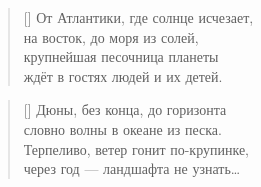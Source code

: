 \documentclass[a5paper,11pt]{memoir}
\begin{document}

\BgThispage

\vspace{4cm}
\color{black}
\begin{verse}[\versewidth]
От Атлантики, где солнце исчезает, \\
на восток, до моря из солей, \\
крупнейшая песочница планеты \\
ждёт в гостях людей и их детей.
\end{verse}

\begin{verse}[\versewidth]
Дюны, без конца, до горизонта \\
словно волны в океане из песка. \\
Терпеливо, ветер гонит по-крупинке, \\
через год --- ландшафта не узнать\ldots
\end{verse}
\end{document}
